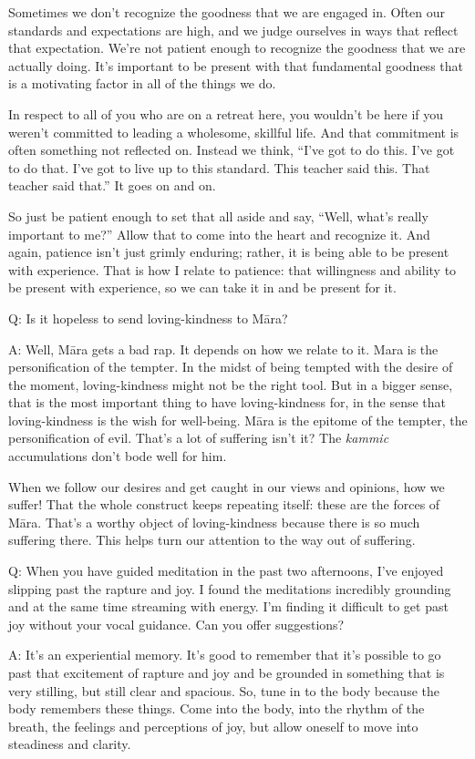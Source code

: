 Sometimes we don’t recognize the goodness that we are engaged in. Often
our standards and expectations are high, and we judge ourselves in ways
that reflect that expectation. We’re not patient enough to recognize the
goodness that we are actually doing. It’s important to be present with
that fundamental goodness that is a motivating factor in all of the
things we do.

In respect to all of you who are on a retreat here, you wouldn’t be here
if you weren’t committed to leading a wholesome, skillful life. And that
commitment is often something not reflected on. Instead we think, “I’ve
got to do this. I’ve got to do that. I’ve got to live up to this
standard. This teacher said this. That teacher said that.” It goes on
and on.

So just be patient enough to set that all aside and say, “Well, what’s
really important to me?” Allow that to come into the heart and recognize
it. And again, patience isn’t just grimly enduring; rather, it is being
able to be present with experience. That is how I relate to patience:
that willingness and ability to be present with experience, so we can
take it in and be present for it.

Q: Is it hopeless to send loving-kindness to Māra?

A: Well, Māra gets a bad rap. It depends on how we relate to it. Mara is
the personification of the tempter. In the midst of being tempted with
the desire of the moment, loving-kindness might not be the right tool.
But in a bigger sense, that is the most important thing to have
loving-kindness for, in the sense that loving-kindness is the wish for
well-being. Māra is the epitome of the tempter, the personification of
evil. That’s a lot of suffering isn’t it? The \emph{kammic}
accumulations don’t bode well for him.

When we follow our desires and get caught in our views and opinions, how
we suffer! That the whole construct keeps repeating itself: these are
the forces of Māra. That’s a worthy object of loving-kindness because
there is so much suffering there. This helps turn our attention to the
way out of suffering.

Q: When you have guided meditation in the past two afternoons, I’ve
enjoyed slipping past the rapture and joy. I found the meditations
incredibly grounding and at the same time streaming with energy. I’m
finding it difficult to get past joy without your vocal guidance. Can
you offer suggestions?

A: It’s an experiential memory. It’s good to remember that it’s possible
to go past that excitement of rapture and joy and be grounded in
something that is very stilling, but still clear and spacious. So, tune
in to the body because the body remembers these things. Come into the
body, into the rhythm of the breath, the feelings and perceptions of
joy, but allow oneself to move into steadiness and clarity.

